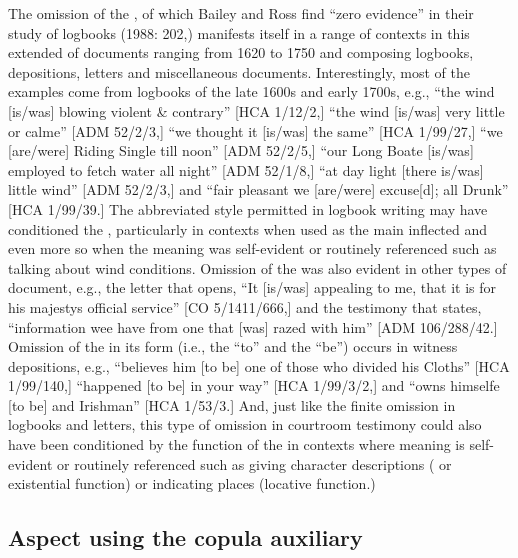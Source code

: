 The omission of the , of which Bailey and Ross find “zero evidence” in their study of  logbooks (1988: 202,) manifests itself in a range of contexts in this extended  of documents ranging from 1620 to 1750 and composing logbooks, depositions, letters and miscellaneous documents. Interestingly, most of the examples come from logbooks of the late 1600s and early 1700s, e.g., “the wind [is/was] blowing violent \& contrary” [HCA 1/12/2,] “the wind [is/was] very little or calme” [ADM 52/2/3,] “we thought it [is/was] the same” [HCA 1/99/27,] “we [are/were] Riding Single till noon” [ADM 52/2/5,] “our Long Boate [is/was] employed to fetch water all night” [ADM 52/1/8,] “at day light [there is/was] little wind” [ADM 52/2/3,] and “fair pleasant we [are/were] excuse[d]; all Drunk” [HCA 1/99/39.] The abbreviated style permitted in logbook writing may have conditioned the , particularly in  contexts when used as the main inflected  and even more so when the meaning was self-evident or routinely referenced such as talking about wind conditions.  Omission of the  was also evident in other types of document, e.g., the letter that opens, “It [is/was] appealing to me, that it is for his majestys official service” [CO 5/1411/666,] and the testimony that states, “information wee have from one that [was] razed with him” [ADM 106/288/42.] Omission of the  in its  form (i.e., the  “to” and the  “be”) occurs in witness depositions, e.g., “believes him [to be] one of those who divided his Cloths” [HCA 1/99/140,] “happened [to be] in your way” [HCA 1/99/3/2,] and “owns himselfe [to be] and Irishman” [HCA 1/53/3.] And, just like the finite omission in logbooks and letters, this type of  omission in courtroom testimony could also have been conditioned by the function of the  in contexts where meaning is self-evident or routinely referenced such as giving character descriptions ( or existential  function) or indicating places (locative  function.)

\subsection{{Aspect} {using} {the} {copula} {auxiliary}}%

